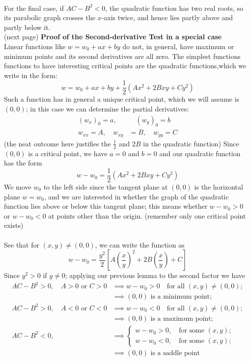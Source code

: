 \documentclass{report}
\begin{document}
\vspace{1mm}\\
For the final case, if $AC-B^2<0$, the quadratic function has two real roots, so its parabolic graph crosses the 
$x$-axis twice, and hence lies partly above and partly
below it.\\
(next page)
\newpage
\noindent\textbf{Proof of the Second-derivative Test in a special case}\\
Linear functions like $w=w_0+ax+by$ do not, in general, have maximum or minimum points and its second derivatives
are all zero. The simplest functions functions to have 
interesting critical points are the quadratic functions,which we write in the form:
\begin{equation*}
w=w_0+ax+by+\frac{1}{2}(Ax^2+2Bxy+Cy^2)
\end{equation*}
Such a function has in general a unique critical point, which we will assume is $(0,0)$; in this case we can
determine the partial derivatives:
\begin{align*}
(w_x)_0=a,&\quad(w_y)_0=b\\
w_{xx}=A,\quad w_{xy}&=B,\quad w_{yy}=C
\end{align*}
(the neat outcome here justifies the $\frac{1}{2}$ and $2B$ in the quadratic function) Since $(0,0)$ is a critical
point, we have $a=0$ and $b=0$ and our quadratic function has the form
\begin{equation*}
w-w_0=\frac{1}{2}(Ax^2+2Bxy+Cy^2)
\end{equation*}
We move $w_0$ to the left side since the tangent plane at $(0,0)$ is the horizontal plane $w=w_0$, and we are 
interested in whether the graph of the quadratic function lies above or below this tangent plane; 
this means whether $w-w_0>0$ or $w-w_0<0$ at points other than the origin. (remember only one critical point exists)
\\
\vspace{1mm}\\
See that for $(x,y)\neq(0,0)$, we can write the function as
\begin{equation*}
w-w_0=\frac{y^2}{2}\left[A\left(\frac{x}{y}\right)^2+2B
\left(\frac{x}{y}\right)+C\right]
\end{equation*}
Since $y^2>0$ if $y\neq0$; applying our previous lemma to the second factor we have
\begin{align*}
AC-B^2>0,\quad A>0\text{ or }C>0&\implies w-w_0>0
\quad\text{for all }(x,y)\neq(0,0);\\
&\implies(0,0)\text{ is a minimum point};\\
AC-B^2>0,\quad A<0\text{ or }C<0&\implies w-w_0<0
\quad\text{for all }(x,y)\neq(0,0);\\
&\implies(0,0)\text{ is a maximum point};\\
AC-B^2<0,\quad&\implies\begin{cases}
w-w_0>0,\quad\text{for some }(x,y);\\
w-w_0<0,\quad\text{for some }(x,y);
\end{cases}\\
&\implies(0,0)\text{ is a saddle point}
\end{align*}
\end{document}
